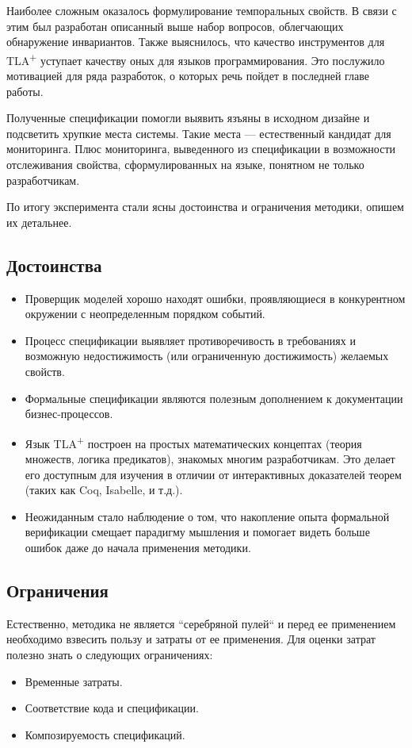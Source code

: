 \documentclass[14pt, openany]{report}
\newcommand{\tlapl}{TLA\textsuperscript{+} }
\begin{document}
Наиболее сложным оказалось формулирование темпоральных свойств. В связи с этим был разработан описанный выше набор вопросов, облегчающих обнаружение инвариантов. Также выяснилось, что качество инструментов для \tlapl уступает качеству оных для языков программирования. Это послужило мотивацией для ряда разработок, о которых речь пойдет в последней главе работы.

Полученные спецификации помогли выявить язъяны в исходном дизайне и подсветить хрупкие места системы. Такие места --- естественный кандидат для мониторинга. Плюс мониторинга, выведенного из спецификации в возможности отслеживания свойства, сформулированных на языке, понятном не только разработчикам.

По итогу эксперимента стали ясны достоинства и ограничения методики, опишем их детальнее.

\subsection{Достоинства}
\begin{itemize}
  \item Проверщик моделей хорошо находят ошибки, проявляющиеся в конкурентном окружении с неопределенным порядком событий.
  \item Процесс спецификации выявляет противоречивость в требованиях и возможную недостижимость (или ограниченную достижимость) желаемых свойств.
  \item Формальные спецификации являются полезным дополнением к документации бизнес-процессов.
  \item Язык \tlapl построен на простых математических концептах (теория множеств, логика предикатов), знакомых многим разработчикам. Это делает его доступным для изучения в отличии от интерактивных доказателей теорем (таких как Coq, Isabelle, и т.д.).
  \item Неожиданным стало наблюдение о том, что накопление опыта формальной верификации смещает парадигму мышления и помогает видеть больше ошибок даже до начала применения методики.
\end{itemize}



\subsection{Ограничения}
Естественно, методика не является ``серебряной пулей`` и перед ее применением необходимо взвесить пользу и затраты от ее применения. Для оценки затрат полезно знать о следующих ограничениях:
\begin{itemize}
  \item Временные затраты.
  \item Соответствие кода и спецификации.
  \item Композируемость спецификаций.
\end{itemize}
\end{document}
